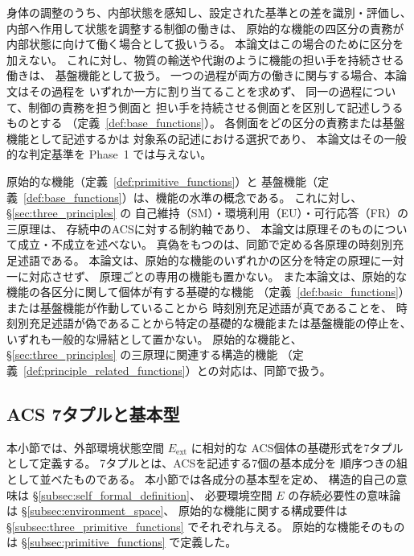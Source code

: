 身体の調整のうち、内部状態を感知し、設定された基準との差を識別・評価し、
内部へ作用して状態を調整する制御の働きは、
原始的な機能の四区分の責務が内部状態に向けて働く場合として扱いうる。
本論文はこの場合のために区分を加えない。
これに対し、物質の輸送や代謝のように機能の担い手を持続させる働きは、
基盤機能として扱う。
一つの過程が両方の働きに関与する場合、本論文はその過程を
いずれか一方に割り当てることを求めず、
同一の過程について、制御の責務を担う側面と
担い手を持続させる側面とを区別して記述しうるものとする
（定義~\ref{def:base_functions}）。
各側面をどの区分の責務または基盤機能として記述するかは
対象系の記述における選択であり、
本論文はその一般的な判定基準を Phase~1 では与えない。

\begin{remark}[原始的な機能と三原理の記述水準の区別]
\label{rem:primitive_vs_principles}
原始的な機能（定義~\ref{def:primitive_functions}）と
基盤機能（定義~\ref{def:base_functions}）は、機能の水準の概念である。
これに対し、\S\ref{sec:three_principles} の
自己維持（SM）・環境利用（EU）・可行応答（FR）の三原理は、
存続中のACSに対する制約軸であり、
本論文は原理そのものについて成立・不成立を述べない。
真偽をもつのは、同節で定める各原理の時刻別充足述語である。
本論文は、原始的な機能のいずれかの区分を特定の原理に一対一に対応させず、
原理ごとの専用の機能も置かない。
また本論文は、原始的な機能の各区分に関して個体が有する基礎的な機能
（定義~\ref{def:basic_functions}）または基盤機能が作動していることから
時刻別充足述語が真であることを、
時刻別充足述語が偽であることから特定の基礎的な機能または基盤機能の停止を、
いずれも一般的な帰結として置かない。
原始的な機能と、\S\ref{sec:three_principles} の三原理に関連する構造的機能
（定義~\ref{def:principle_related_functions}）との対応は、同節で扱う。
\end{remark}

\subsection{ACS 7タプルと基本型}
\label{subsec:acs_7tuple}

本小節では、外部環境状態空間 $E_{\mathrm{ext}}$ に相対的な
ACS個体の基礎形式を7タプルとして定義する。
7タプルとは、ACSを記述する7個の基本成分を
順序つきの組として並べたものである。
本小節では各成分の基本型を定め、
構造的自己の意味は \S\ref{subsec:self_formal_definition}、
必要環境空間 $E$ の存続必要性の意味論は
\S\ref{subsec:environment_space}、
原始的な機能に関する構成要件は
\S\ref{subsec:three_primitive_functions} でそれぞれ与える。
原始的な機能そのものは \S\ref{subsec:primitive_functions} で定義した。

